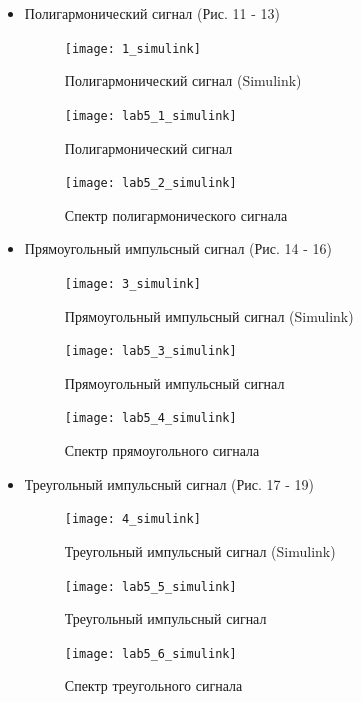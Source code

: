 \documentclass[10pt,a4paper]{article}
\begin{document}
\begin{itemize}
\item Полигармонический сигнал (Рис. 11 - 13)
\begin{figure}[h]
\centering
\texttt{[image: 1\_simulink]} 
\caption{Полигармонический сигнал (Simulink)} 
\label{fig.l5_1s} 
\end{figure}
\begin{figure}[h]
\centering
\texttt{[image: lab5\_1\_simulink]} 
\caption{Полигармонический сигнал} 
\label{fig.l5_2s1} 
\end{figure}
\begin{figure}[h]
\centering
\texttt{[image: lab5\_2\_simulink]}
\caption{Спектр полигармонического сигнала} 
\label{fig.l5_3s} 
\end{figure}

\item Прямоугольный импульсный сигнал (Рис. 14 - 16)
\begin{figure}[h]
\centering
\texttt{[image: 3\_simulink]} 
\caption{Прямоугольный импульсный сигнал (Simulink)} 
\label{fig.l5_4s} 
\end{figure}
\begin{figure}[h]
\centering
\texttt{[image: lab5\_3\_simulink]} 
\caption{Прямоугольный импульсный сигнал} 
\label{fig.l5_5s} 
\end{figure}
\begin{figure}[h]
\centering
\texttt{[image: lab5\_4\_simulink]}
\caption{Спектр прямоугольного сигнала} 
\label{fig.l5_6s} 
\end{figure}

\item Треугольный импульсный сигнал (Рис. 17 - 19)
\begin{figure}[h]
\centering
\texttt{[image: 4\_simulink]} 
\caption{Треугольный импульсный сигнал (Simulink)} 
\label{fig.l5_7s} 
\end{figure}
\begin{figure}[h]
\centering
\texttt{[image: lab5\_5\_simulink]} 
\caption{Треугольный импульсный сигнал} 
\label{fig.l5_8s} 
\end{figure}
\begin{figure}[h]
\centering
\texttt{[image: lab5\_6\_simulink]}
\caption{Спектр треугольного сигнала} 
\label{fig.l5_9s} 
\end{figure}
\end{itemize}
\FloatBarrier
\end{document}
